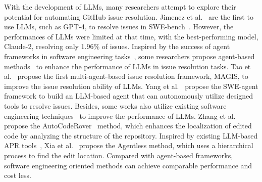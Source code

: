 

With the development of LLMs, many researchers attempt to explore their potential for automating GitHub issue resolution. Jimenez et al.~\cite{jimenez2023swe} are the first to use LLMs, such as GPT-4, to resolve issues in SWE-bench~\cite{jimenez2023swe}. However, the performances of LLMs were limited at that time, with the best-performing model, Claude-2, resolving only 1.96\% of issues. Inspired by the success of agent frameworks in software engineering tasks~\cite{huang2024agents,liu2024large,feldt2023towards}, some researchers propose agent-based methods~\cite{tao2024magis,zhang2024autocoderover,yang2024swe,chen2024coder,liu2024marscode,wang2024opendevin,bouzenia2024repairagent,ruan2024specrover,zhang2024diversity} to enhance the performance of LLMs in issue resolution tasks. Tao et al.~\cite{tao2024magis} propose the first multi-agent-based issue resolution framework, MAGIS, to improve the issue resolution ability of LLMs. Yang et al.~\cite{yang2024swe} propose the SWE-agent framework to build an LLM-based agent that can autonomously utilize designed tools to resolve issues. Besides, some works also utilize existing software engineering techniques~\cite{wong2016survey,jones2005empirical,lou2020can} to improve the performance of LLMs. Zhang et al. propose the AutoCodeRover~\cite{zhang2024autocoderover} method, which enhances the localization of edited code by analyzing the structure of the repository.  Inspired
by existing LLM-based APR tools~\cite{xia2023automated,xia2023keep,bouzenia2024repairagent,hidvegi2024cigar,chen2024flakiness,zhang2024acfix}, Xia et al.~\cite{xia2024agentless} propose the Agentless method, which uses a hierarchical process to find the edit location. Compared with agent-based frameworks, software engineering oriented methods can achieve comparable performance and cost less.

